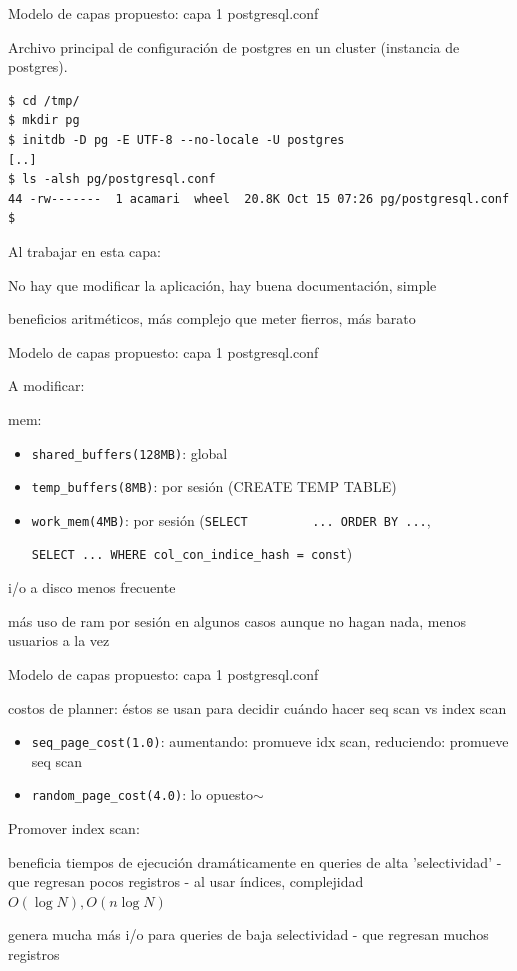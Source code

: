 \documentclass[11pt,spanish]{article}
\newcommand{\rowsp}[1][1em]{\vspace{#1}}
\newcommand{\hone}[1]{{\rowsp[0.3em]\noindent\Large #1 \rowsp[0.3em]}}
\newcommand{\myitm}[1]{\begin{itemize}#1\end{itemize}}
\newcommand{\mydesc}[1]{%
	\begin{description}
	\setlength\itemsep{0em}%
	#1
	\end{description}
}
\newcommand{\pros}{\item[pros:]}
\newcommand{\cons}{\item[cons:]}
\begin{document}
\newpage %
\hone{Modelo de capas propuesto: capa 1 postgresql.conf}

Archivo principal de configuración de postgres en un cluster (instancia de
postgres).

\begin{lstlisting}
$ cd /tmp/
$ mkdir pg
$ initdb -D pg -E UTF-8 --no-locale -U postgres
[..]
$ ls -alsh pg/postgresql.conf
44 -rw-------  1 acamari  wheel  20.8K Oct 15 07:26 pg/postgresql.conf
$ 
\end{lstlisting}

Al trabajar en esta capa:
\mydesc{\pros No hay que modificar la aplicación, hay buena documentación,
		simple
	\cons beneficios aritméticos, más complejo  que meter fierros, más barato}

\newpage %
\hone{Modelo de capas propuesto: capa 1 postgresql.conf}

A modificar:
\mydesc{
	\item[mem:] \ 
	\myitm{
		\item \lstinline!shared_buffers(128MB)!: global
		\item \lstinline!temp_buffers(8MB)!: por sesión
			(CREATE TEMP TABLE)
		\item \lstinline!work_mem(4MB)!: por sesión (\lstinline!SELECT
		... ORDER BY ...!,

		\lstinline!SELECT ... WHERE col_con_indice_hash = const!)
	}
	\mydesc{
		\pros i/o a disco menos frecuente
		\cons más uso de ram por sesión  en algunos casos aunque no
		hagan nada, menos usuarios a la vez}
}

\newpage %
\hone{Modelo de capas propuesto: capa 1 postgresql.conf}

\mydesc{
	\item[costos de planner:] éstos se usan para decidir cuándo
	hacer seq scan vs index scan
	\myitm{
		\item \lstinline!seq_page_cost(1.0)!: aumentando: promueve idx
		scan, reduciendo: promueve seq scan
		\item \lstinline!random_page_cost(4.0)!: lo opuesto$\sim$
	}

	Promover index scan:
	\mydesc{
		\pros beneficia tiempos de ejecución dramáticamente en queries
			de alta 'selectividad' - que regresan pocos registros -
			al usar índices, complejidad $O(\log N), O(n \log N)$
		\cons genera mucha más i/o para queries de baja selectividad -
			que regresan muchos registros
	}

}
\end{document}
